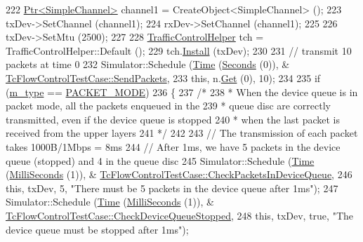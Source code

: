 \begin{DoxyCode}
222   \hyperlink{classns3_1_1Ptr}{Ptr<SimpleChannel>} channel1 = CreateObject<SimpleChannel> ();
223   txDev->SetChannel (channel1);
224   rxDev->SetChannel (channel1);
225 
226   txDev->SetMtu (2500);
227 
228   \hyperlink{classns3_1_1TrafficControlHelper}{TrafficControlHelper} tch = TrafficControlHelper::Default ();
229   tch.\hyperlink{classns3_1_1TrafficControlHelper_a0aa6a8e2fbb1c196589e16f48c99f0b9}{Install} (txDev);
230 
231   \textcolor{comment}{// transmit 10 packets at time 0}
232   Simulator::Schedule (\hyperlink{classns3_1_1Time}{Time} (\hyperlink{group__timecivil_ga33c34b816f8ff6628e33d5c8e9713b9e}{Seconds} (0)), &
      \hyperlink{classTcFlowControlTestCase_a88bdf76e668d4e9b1edcce980768c96e}{TcFlowControlTestCase::SendPackets},
233                       \textcolor{keyword}{this}, n.\hyperlink{classns3_1_1NodeContainer_a9ed96e2ecc22e0f5a3d4842eb9bf90bf}{Get} (0), 10);
234 
235   \textcolor{keywordflow}{if} (\hyperlink{classTcFlowControlTestCase_a48b76fa61206d08fadd399b379bdbf56}{m\_type} == \hyperlink{classTcFlowControlTestCase_a63146d60b911dd039c9cf960cbddb458a294d1e27d6e81fc7a19f37ec1f5ba1d8}{PACKET\_MODE})
236     \{
237       \textcolor{comment}{/*}
238 \textcolor{comment}{       * When the device queue is in packet mode, all the packets enqueued in the}
239 \textcolor{comment}{       * queue disc are correctly transmitted, even if the device queue is stopped}
240 \textcolor{comment}{       * when the last packet is received from the upper layers}
241 \textcolor{comment}{       */}
242 
243       \textcolor{comment}{// The transmission of each packet takes 1000B/1Mbps = 8ms}
244       \textcolor{comment}{// After 1ms, we have 5 packets in the device queue (stopped) and 4 in the queue disc}
245       Simulator::Schedule (\hyperlink{classns3_1_1Time}{Time} (\hyperlink{group__timecivil_gaf26127cf4571146b83a92ee18679c7a9}{MilliSeconds} (1)), &
      \hyperlink{classTcFlowControlTestCase_a7ad467b39fdb155daea4b048619f6d12}{TcFlowControlTestCase::CheckPacketsInDeviceQueue},
246                           \textcolor{keyword}{this}, txDev, 5, \textcolor{stringliteral}{"There must be 5 packets in the device queue after 1ms"});
247       Simulator::Schedule (\hyperlink{classns3_1_1Time}{Time} (\hyperlink{group__timecivil_gaf26127cf4571146b83a92ee18679c7a9}{MilliSeconds} (1)), &
      \hyperlink{classTcFlowControlTestCase_a4ccc9564c9142984fa8041f67b4a518a}{TcFlowControlTestCase::CheckDeviceQueueStopped},
248                           \textcolor{keyword}{this}, txDev, \textcolor{keyword}{true}, \textcolor{stringliteral}{"The device queue must be stopped after 1ms"});

\end{DoxyCode}
